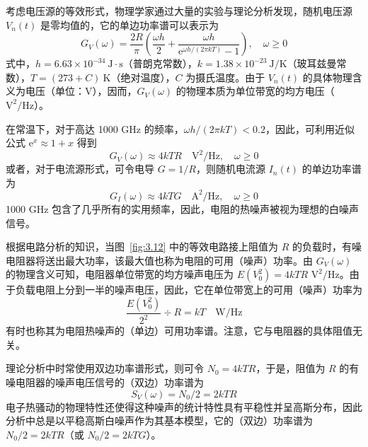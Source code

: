 \documentclass[11pt,openany,UTF8]{ctexbook}
\newcommand{\eu}{\mathrm{e}}                       %
\begin{document}
考虑电压源的等效形式\nobreak，物理学家通过大量的实验与理论分析发现\nobreak，随机电压源 $V_n(t)$ 是零均值的\nobreak，它的单边功率谱可以表示为
\begin{equation}
G_V(\omega)=\frac{2R}{\pi}\left(\frac{\omega h}{2}+\frac{\omega h}{\eu^{\omega h/(2\pi kT)}-1}\right),\quad \omega\geqslant0
\label{eq:3.28}
\end{equation}
式中\nobreak，$h=6.63\times10^{-34}\ \mathrm{J}\cdot\mathrm{s}$（普朗克常数\nobreak）\nobreak，$k=1.38\times10^{-23}\ \mathrm{J}/\mathrm{K}$（玻耳兹曼常数\nobreak）\nobreak，$T=(273+C)\ \mathrm{K}$（绝对温度\nobreak）\nobreak，$C$ 为摄氏温度\nobreak。由于 $V_n(t)$ 的具体物理含义为电压（单位\nobreak：V\nobreak）\nobreak，因而\nobreak，$G_V(\omega)$ 的物理本质为单位带宽的均方电压（$\mathrm{V}^2/\mathrm{Hz}$\nobreak）\nobreak。

在常温下\nobreak，对于高达 1000 GHz 的频率\nobreak，$\omega h/(2\pi kT)<0.2$\nobreak，因此\nobreak，可利用近似公式 $\eu^{x}\approx1+x$ 得到
\begin{equation}
G_V(\omega)\approx4kTR\quad \mathrm{V}^2/\mathrm{Hz},\quad \omega\geqslant0
\label{eq:3.29}
\end{equation}
或者\nobreak，对于电流源形式\nobreak，可令电导 $G=1/R$\nobreak，则随机电流源 $I_n(t)$ 的单边功率谱为
\begin{equation}
G_I(\omega)\approx4kTG\quad \mathrm{A}^2/\mathrm{Hz},\quad \omega\geqslant0
\label{eq:3.30}
\end{equation}
1000 GHz 包含了几乎所有的实用频率\nobreak，因此\nobreak，电阻的热噪声被视为理想的白噪声信号\nobreak。

根据电路分析的知识\nobreak，当图~\ref{fig:3.12} 中的等效电路接上阻值为 $R$ 的负载时\nobreak，有噪电阻器将送出最大功率\nobreak，该最大值也称为电阻的可用（噪声\nobreak）功率\nobreak。由 $G_V(\omega)$ 的物理含义可知\nobreak，电阻器单位带宽的均方噪声电压为 $E(V_0^2)=4kTR$ $\mathrm{V}^2/\mathrm{Hz}$\nobreak。由于负载电阻上分到一半的噪声电压\nobreak，因此\nobreak，它在单位带宽上的可用（噪声\nobreak）功率为
\[
\frac{E(V_0^2)}{2^2}\div R=kT\quad \mathrm{W}/\mathrm{Hz}
\]
有时也称其为电阻热噪声的（单边\nobreak）可用功率谱\nobreak。注意\nobreak，它与电阻器的具体阻值无关\nobreak。

理论分析中时常使用双边功率谱形式\nobreak，则可令 $N_0=4kTR$\nobreak，于是\nobreak，阻值为 $R$ 的有噪电阻器的噪声电压信号的（双边\nobreak）功率谱为
\begin{equation}
S_V(\omega)=N_0/2=2kTR
\label{eq:3.31}
\end{equation}
电子热骚动的物理特性还使得这种噪声的统计特性具有平稳性并呈高斯分布\nobreak，因此分析中总是以平稳高斯白噪声作为其基本模型\nobreak，它的（双边\nobreak）功率谱为 $N_0/2=2kTR$（或 $N_0/2=2kTG$\nobreak）\nobreak。
\end{document}
